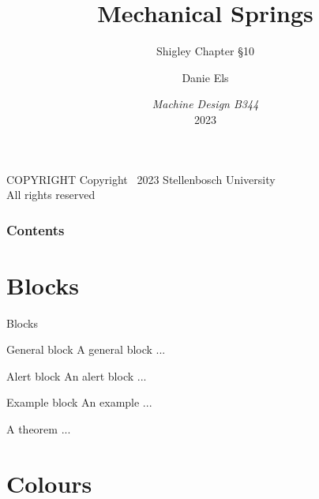 \documentclass[xcolor={svgnames,table},10pt,fleqn]{beamer}
\title[Springs]{Mechanical Springs}
\subtitle{Shigley Chapter \S10}
\author{Danie Els}
\institute{Dept of Mech \& Mechatronic Eng,\\
           Stellenbosch University}
\date{\textit{Machine Design B344}\\2023}
\begin{document}
\begin{frame}
  \maketitle
\end{frame}

\begin{frame}
    \begin{alertblock}{COPYRIGHT}
    Copyright \textcopyright\ 2023 Stellenbosch University\\
    All rights reserved
    \end{alertblock}
\end{frame}

\begin{frame}
  \frametitle{Contents}
  \tableofcontents
\end{frame}

\section{Blocks}

\begin{frame}{Blocks}
\begin{block}{General block}
    A general block ...
\end{block}
\begin{alertblock}{Alert block}
    An alert block ...
\end{alertblock}
\begin{exampleblock}{Example block}
    An example ...
\end{exampleblock}
\begin{theorem}
    A theorem ...
\end{theorem}
\end{frame}

\section{Colours}
\end{document}
